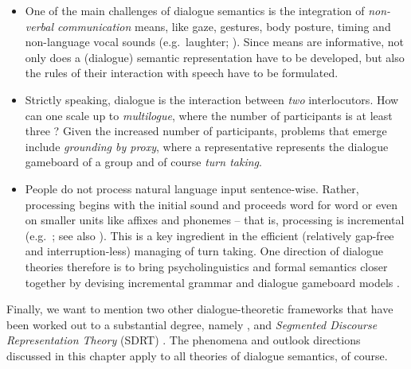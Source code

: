 \documentclass[output=paper,biblatex,babelshorthands,newtxmath,draftmode,colorlinks,citecolor=brown]{langscibook}
\begin{document}
\begin{itemize}
    \item 
One of the main challenges of dialogue semantics is the integration of \emph{non-verbal communication} means, like gaze, gestures, body posture, timing and non-language  vocal sounds (e.g.\ laughter; \citealt{Ginzburg:Breitholz:Cooper:Hough:Tian:2015,Tian:Mazzocconi:Ginzburg:2016}).
%
Since  means are informative, not only does a (dialogue) semantic representation have to be developed, but also the rules of their interaction with speech have to be formulated. 

\item Strictly speaking, dialogue is the interaction between \emph{two} interlocutors.
%
How can one scale up to \emph{multilogue}, where the number of participants is at least three \citep{Ginzburg:Fernandez:2005}?
%
Given the increased number of participants,  problems that emerge include  \emph{grounding by proxy}, where a representative represents the dialogue gameboard of a group \citep{Eshghi:Healey:2016} and of course \emph{turn taking}.

\item People do not process natural language input sentence-wise.
%
Rather, processing begins with the initial sound and proceeds word for word or even on smaller units like affixes and phonemes -- that is, processing is incremental (e.g.\ \citealt{Sedivy:Tanenhaus:Chambers:Carlson:1999}; see also ). This is a key ingredient in the efficient (relatively gap-free and interruption-less) managing of turn taking.
%
One direction of dialogue theories therefore is to bring psycholinguistics and formal semantics closer together by devising incremental grammar and dialogue gameboard models \citep{Hough:Kennington:Schlangen:Ginzburg:2015,Demberg:Keller:Koller:2013,Poesio:Rieser:2011}.

\end{itemize}

Finally, we want to mention two other dialogue-theoretic frameworks that have been worked out to a substantial degree, namely  \citep{Traum:1994,Poesio:1995,Poesio:Traum:1997,Poesio:Rieser:2010}, and \emph{Segmented Discourse Representation Theory} (SDRT) \citep{Asher:1993,Asher:Lascarides:2003,Asher:Lascarides:2013,Hunter:Asher:2015}.
%
The phenomena and outlook directions discussed in this chapter apply to all theories of dialogue semantics, of course. 
\end{document}
